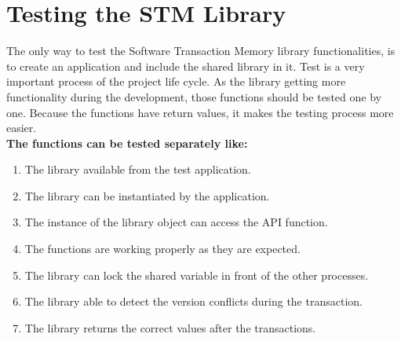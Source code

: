\documentclass[12pt]{article}
\begin{document}
\section{Testing the STM Library}
The only way to test the Software Transaction Memory library functionalities, is to create an application and include the shared library in it. Test is a very important process of the project life cycle.
As the library getting more functionality during the development, those functions should be tested one by one. Because the functions have return values, it makes the testing process more easier.\\

\textbf{The functions can be tested separately like:}
\begin{enumerate}
\item The library available from the test application.
\item The library can be instantiated by the application.
\item The instance of the library object can access the API function.
\item The functions are working properly as they are expected.
\item The library can lock the shared variable in front of the other processes.
\item The library able to detect the version conflicts during the transaction.
\item The library returns the correct values after the transactions.
\end{enumerate}
\end{document}
